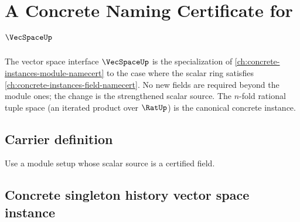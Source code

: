 \chapter{A Concrete Naming Certificate for \(\VecSpaceUp\)}
\label{ch:concrete-instances-vecspace-namecert}

The vector space interface \(\VecSpaceUp\) is the specialization of \autoref{ch:concrete-instances-module-namecert} to the case where the scalar ring satisfies \autoref{ch:concrete-instances-field-namecert}. No new fields are required beyond the module ones; the change is the strengthened scalar source. The \(n\)-fold rational tuple space (an iterated product over \(\RatUp\)) is the canonical concrete instance.

\section{Carrier definition}

\begin{definition}
\label{def:vecspace-carrier}
Use a module setup whose scalar source is a certified field.
\end{definition}

\section{Concrete singleton history vector space instance}
\label{sec:vecspace-concrete-singleton-history-instance}

